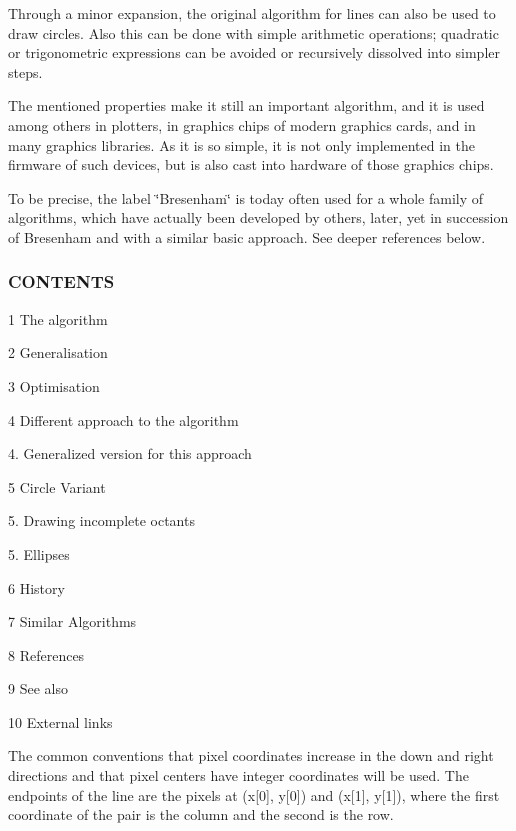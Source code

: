 Through a minor expansion, the original algorithm for lines can also be used to draw circles. Also this can be done with simple arithmetic operations; quadratic or trigonometric expressions can be avoided or recursively dissolved into simpler steps.

The mentioned properties make it still an important algorithm, and it is used among others in plotters, in graphics chips of modern graphics cards, and in many graphics libraries. As it is so simple, it is not only implemented in the firmware of such devices, but is also cast into hardware of those graphics chips.

To be precise, the label \char`\"{}\+Bresenham\char`\"{} is today often used for a whole family of algorithms, which have actually been developed by others, later, yet in succession of Bresenham and with a similar basic approach. See deeper references below.

\subsubsection*{C\+O\+N\+T\+E\+N\+TS}


\begin{DoxyItemize}
\item 1 The algorithm
\item 2 Generalisation
\item 3 Optimisation
\item 4 Different approach to the algorithm
\begin{DoxyItemize}
\item 4. Generalized version for this approach
\end{DoxyItemize}
\item 5 Circle Variant
\begin{DoxyItemize}
\item 5. Drawing incomplete octants
\item 5. Ellipses
\end{DoxyItemize}
\item 6 History
\item 7 Similar Algorithms
\item 8 References
\item 9 See also
\item 10 External links
\end{DoxyItemize}

The common conventions that pixel coordinates increase in the down and right directions and that pixel centers have integer coordinates will be used. The endpoints of the line are the pixels at (x\mbox{[}0\mbox{]}, y\mbox{[}0\mbox{]}) and (x\mbox{[}1\mbox{]}, y\mbox{[}1\mbox{]}), where the first coordinate of the pair is the column and the second is the row.


